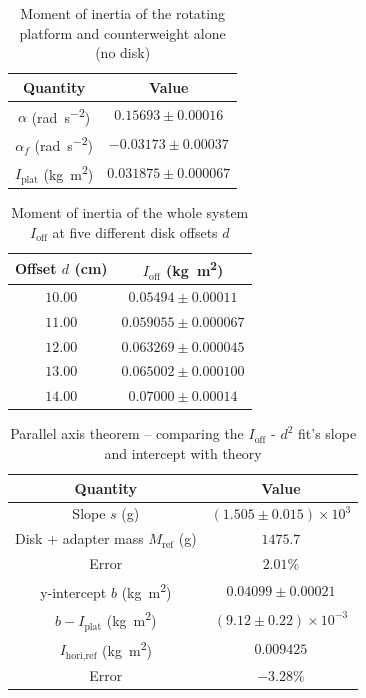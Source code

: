 \begin{table}[htb!]
\centering
\caption{Moment of inertia of the rotating platform and counterweight alone (no disk)}
\begin{tabular}{cc}
\toprule
Quantity & Value \\
\midrule
$\alpha$ (\unit{\radian\per\s\squared}) & $0.15693 \pm 0.00016$ \\
$\alpha_{f}$ (\unit{\radian\per\s\squared}) & $-0.03173 \pm 0.00037$ \\
$I_{\text{plat}}$ (\unit{\kg\m\squared}) & $0.031875 \pm 0.000067$ \\
\bottomrule
\end{tabular}
\end{table}
\begin{table}[htb!]
\centering
\caption{Moment of inertia of the whole system $I_{\text{off}}$ at five different disk offsets $d$}
\begin{tabular}{cc}
\toprule
Offset $d$ (\unit{\cm}) & $I_{\text{off}}$ (\unit{\kg\m\squared}) \\
\midrule
$10.00$ & $0.05494 \pm 0.00011$ \\
$11.00$ & $0.059055 \pm 0.000067$ \\
$12.00$ & $0.063269 \pm 0.000045$ \\
$13.00$ & $0.065002 \pm 0.000100$ \\
$14.00$ & $0.07000 \pm 0.00014$ \\
\bottomrule
\end{tabular}
\end{table}
\begin{table}[htb!]
\centering
\caption{Parallel axis theorem -- comparing the $I_{\text{off}}$ - $d^{2}$ fit's slope and intercept with theory}
\begin{tabular}{cc}
\toprule
Quantity & Value \\
\midrule
Slope $s$ (\unit{\g}) & $(1.505 \pm 0.015)\times 10^{3}$ \\
Disk + adapter mass $M_{\text{ref}}$ (\unit{\g}) & $1475.7$ \\
Error & $2.01\%$ \\
y-intercept $b$ (\unit{\kg\m\squared}) & $0.04099 \pm 0.00021$ \\
$b-I_{\text{plat}}$ (\unit{\kg\m\squared}) & $(9.12 \pm 0.22)\times 10^{-3}$ \\
$I_{\text{hori,ref}}$ (\unit{\kg\m\squared}) & $0.009425$ \\
Error & $-3.28\%$ \\
\bottomrule
\end{tabular}
\end{table}

